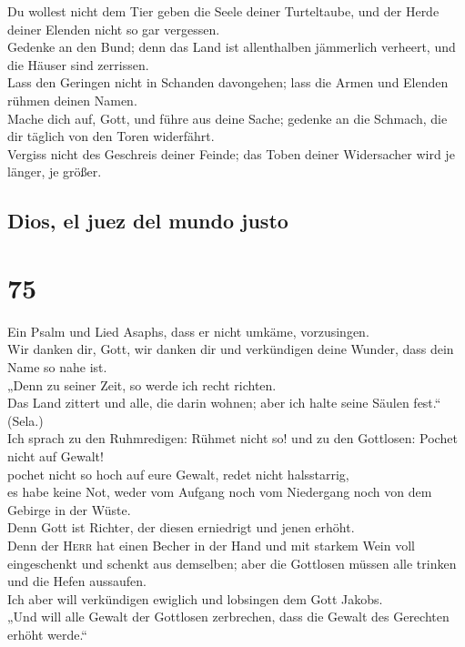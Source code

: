  Du wollest nicht dem Tier geben die Seele deiner
Turteltaube, und der Herde deiner Elenden nicht so gar vergessen.\\
 Gedenke an den Bund; denn das Land ist allenthalben
jämmerlich verheert, und die Häuser sind zerrissen.\\
 Lass den Geringen nicht in Schanden davongehen; lass die
Armen und Elenden rühmen deinen Namen.\\
 Mache dich auf, Gott, und führe aus deine Sache; gedenke
an die Schmach, die dir täglich von den Toren widerfährt.\\
 Vergiss nicht des Geschreis deiner Feinde; das Toben
deiner Widersacher wird je länger, je größer.

\hypertarget{dios-el-juez-del-mundo-justo}{%
\subsection{Dios, el juez del mundo
justo}\label{dios-el-juez-del-mundo-justo}}

\hypertarget{section-74}{%
\section{75}\label{section-74}}

 Ein Psalm und Lied Asaphs, dass er nicht umkäme,
vorzusingen.\\
 Wir danken dir, Gott, wir danken dir und verkündigen
deine Wunder, dass dein Name so nahe ist.\\
 „Denn zu seiner Zeit, so werde ich recht richten.\\
 Das Land zittert und alle, die darin wohnen; aber ich
halte seine Säulen fest.`` (Sela.)\\
 Ich sprach zu den Ruhmredigen: Rühmet nicht so! und zu
den Gottlosen: Pochet nicht auf Gewalt!\\
 pochet nicht so hoch auf eure Gewalt, redet nicht
halsstarrig,\\
 es habe keine Not, weder vom Aufgang noch vom Niedergang
noch von dem Gebirge in der Wüste.\\
 Denn Gott ist Richter, der diesen erniedrigt und jenen
erhöht.\\
 Denn der \textsc{Herr} hat einen Becher in der Hand und
mit starkem Wein voll eingeschenkt und schenkt aus demselben; aber die
Gottlosen müssen alle trinken und die Hefen aussaufen.\\
 Ich aber will verkündigen ewiglich und lobsingen dem
Gott Jakobs.\\
 „Und will alle Gewalt der Gottlosen zerbrechen, dass die
Gewalt des Gerechten erhöht werde.``

